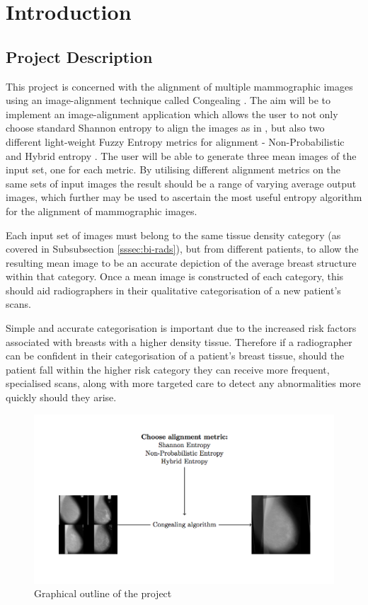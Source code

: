 \chapter{Introduction}

\section{Project Description}
This project is concerned with the alignment of multiple mammographic images using an image-alignment technique called \Gls{Congealing} \cite{joint-alignment}. The aim will be to implement an image-alignment application which allows the user to not only choose standard Shannon entropy to align the images as in \cite{joint-alignment}, but also two different light-weight Fuzzy Entropy metrics for alignment - Non-Probabilistic \cite{DeLuca_Termini_1972} and Hybrid entropy \cite{Pal_Pal_1992}. The user will be able to generate three mean images of the input set, one for each metric. By utilising different alignment metrics on the same sets of input images the result should be a range of varying average output images, which further may be used to ascertain the most useful entropy algorithm for the alignment of mammographic images.

Each input set of images must belong to the same tissue density category (as covered in Subsubsection \ref{sssec:bi-rads}), but from different patients, to allow the resulting mean image to be an accurate depiction of the average breast structure within that category. Once a mean image is constructed of each category, this should aid radiographers in their qualitative categorisation of a new patient's scans.

Simple and accurate categorisation is important due to the increased risk factors associated with breasts with a higher density tissue. Therefore if a radiographer can be confident in their categorisation of a patient's breast tissue, should the patient fall within the higher risk category they can receive more frequent, specialised scans, along with more targeted care to detect any abnormalities more quickly should they arise.

\begin{figure}[H]
  \center
    \includegraphics{Introduction/diagram/diagram.png}
    \caption{Graphical outline of the project}
    \label{fig:project-desc-img}
\end{figure}



